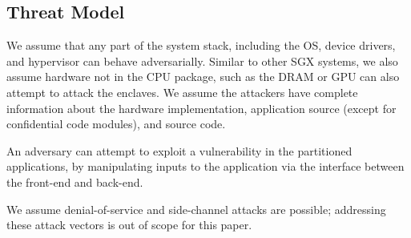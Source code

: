 







\subsection{Threat Model}


We assume that any part of the system stack, including the OS,
device drivers, and hypervisor can behave adversarially.
Similar to other SGX systems, we also assume 
hardware not in the CPU package, such as the DRAM or GPU 
can also attempt to attack the enclaves.
We assume the attackers have complete information
about the \sgx{} hardware implementation, application source (except for confidential code modules), and \systemname{} source code.

An adversary can attempt to
exploit a vulnerability in the partitioned applications,
by manipulating inputs to the application via the interface between the
front-end and back-end.

We assume denial-of-service and side-channel attacks are possible; 
addressing these attack vectors is out of scope for this paper.


